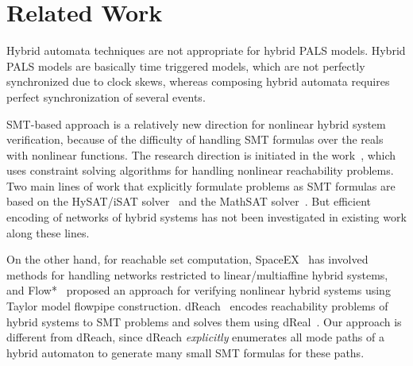 

\section{Related Work}
\label{sec:related-work}



Hybrid automata techniques are not appropriate for hybrid PALS models.
Hybrid PALS models are basically time triggered models, which are not perfectly synchronized due to clock skews,
whereas composing hybrid automata requires perfect synchronization of several events.

SMT-based approach is a relatively new direction for nonlinear hybrid
system verification, because of the difficulty of handling SMT
formulas over the reals with nonlinear functions. The research
direction is initiated in the
work~\cite{ratschan2007safety}, which uses constraint
solving algorithms for handling nonlinear reachability problems. Two
main lines of work that explicitly formulate problems as SMT formulas
are based on the HySAT/iSAT
solver~\cite{DBLP:journals/fmsd/FranzleH07,eggers2008sat}
and the MathSAT
solver~\cite{DBLP:conf/aaai/CimattiMT12,DBLP:conf/fmcad/CimattiMT12}.
But efficient encoding of networks of hybrid systems has not been
investigated in existing work along these lines. 

On the other hand,
for reachable set computation, 
SpaceEX~\cite{DBLP:conf/cav/FrehseGDCRLRGDM11}
has involved methods for handling networks restricted to linear/multiaffine hybrid systems,
and 
Flow*~\cite{DBLP:conf/cav/ChenAS13} proposed an approach for verifying
nonlinear hybrid systems using Taylor model flowpipe construction. 
%
dReach~\cite{dReach}
encodes reachability problems of hybrid systems to SMT problems and
solves them using %
dReal~\cite{dReal}.
%
Our approach is different from dReach, 
since dReach \emph{explicitly} enumerates all mode paths of a hybrid automaton
to generate many small SMT formulas for these paths.





